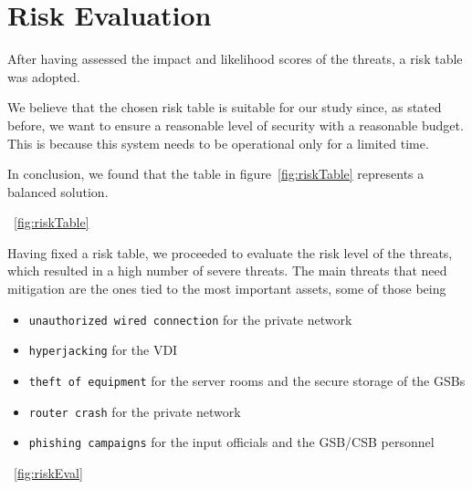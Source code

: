 \section*{Risk Evaluation}

After having assessed the impact and likelihood scores of the threats, a risk table was adopted. 

We believe that the chosen risk table is suitable for our study since, as stated before, we want to ensure a reasonable level of security with a reasonable budget. This is because this system needs to be operational only for a limited time.

In conclusion, we found that the table in figure~\ref{fig:riskTable} represents a balanced solution.

~\ref{fig:riskTable}

Having fixed a risk table, we proceeded to evaluate the risk level of the threats, which resulted in a high number of severe threats. The main threats that need mitigation are the ones tied to the most important assets, some of those being

\begin{itemize}
    \item \texttt{unauthorized wired connection} for the private network
    \item \texttt{hyperjacking} for the VDI
    \item \texttt{theft of equipment} for the server rooms and the secure storage of the GSBs
    \item \texttt{router crash} for the private network
    \item \texttt{phishing campaigns} for the input officials and the GSB/CSB personnel
\end{itemize}

~\ref{fig:riskEval}
